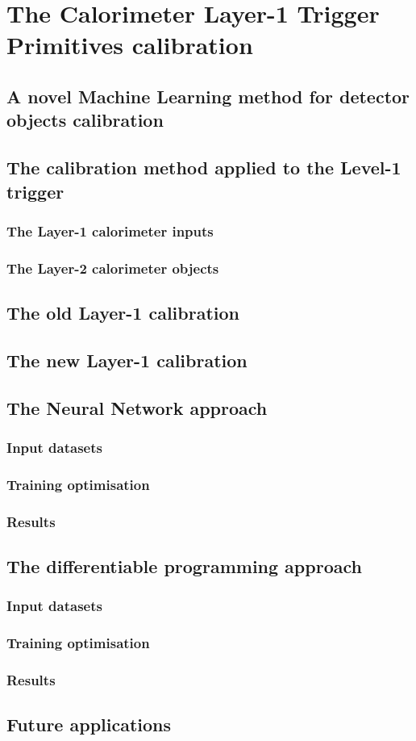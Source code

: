 \chapter{The Calorimeter Layer-1 Trigger Primitives calibration}

\section{A novel Machine Learning method for detector objects calibration}

\section{The calibration method applied to the Level-1 trigger}

\subsection{The Layer-1 calorimeter inputs}
\subsection{The Layer-2 calorimeter objects}

\section{The old Layer-1 calibration}

\section{The new Layer-1 calibration}

\section{The Neural Network approach}
\subsection{Input datasets}
\subsection{Training optimisation}
\subsection{Results}

\section{The differentiable programming approach}
\subsection{Input datasets}
\subsection{Training optimisation}
\subsection{Results}

\section{Future applications}